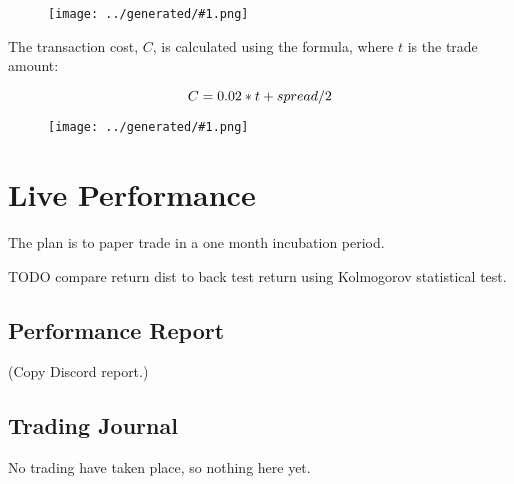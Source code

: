 \documentclass[a4paper]{article}
\newcommand{\figureTau}[1]{
    \begin{figure}[H]
        \begin{center}
            \texttt{[image: ../generated/\#1.png]}
        \end{center}
    \end{figure}
}
\begin{document}
\figureTau{cumulative_returns}

The transaction cost, $C$, is calculated using the formula, where $t$ is the trade amount:

\begin{equation}
\label{eq:NPV_L}
C = 0.02 * t + spread/2
\end{equation}

\figureTau{cumulative_returns_except_trans_costs}

\section{Live Performance}

The plan is to paper trade in a one month incubation period.

TODO compare return dist to back test return using Kolmogorov statistical test. %

\subsection{Performance Report}

(Copy Discord report.)

\subsection{Trading Journal}

No trading have taken place, so nothing here yet.

\end{document}
